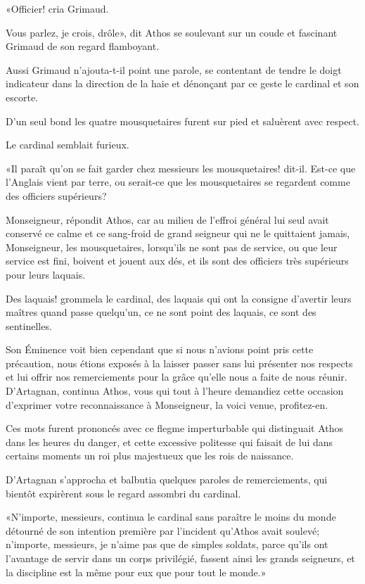 «Officier! cria Grimaud. 

\speak  Vous parlez, je crois, drôle», dit Athos se soulevant sur un coude et fascinant Grimaud de son regard flamboyant. 

Aussi Grimaud n'ajouta-t-il point une parole, se contentant de tendre le doigt indicateur dans la direction de la haie et dénonçant par ce geste le cardinal et son escorte. 

D'un seul bond les quatre mousquetaires furent sur pied et saluèrent avec respect. 

Le cardinal semblait furieux. 

«Il paraît qu'on se fait garder chez messieurs les mousquetaires! dit-il. Est-ce que l'Anglais vient par terre, ou serait-ce que les mousquetaires se regardent comme des officiers supérieurs? 

\speak  Monseigneur, répondit Athos, car au milieu de l'effroi général lui seul avait conservé ce calme et ce sang-froid de grand seigneur qui ne le quittaient jamais, Monseigneur, les mousquetaires, lorsqu'ils ne sont pas de service, ou que leur service est fini, boivent et jouent aux dés, et ils sont des officiers très supérieurs pour leurs laquais. 

\speak  Des laquais! grommela le cardinal, des laquais qui ont la consigne d'avertir leurs maîtres quand passe quelqu'un, ce ne sont point des laquais, ce sont des sentinelles. 

\speak  Son Éminence voit bien cependant que si nous n'avions point pris cette précaution, nous étions exposés à la laisser passer sans lui présenter nos respects et lui offrir nos remerciements pour la grâce qu'elle nous a faite de nous réunir. D'Artagnan, continua Athos, vous qui tout à l'heure demandiez cette occasion d'exprimer votre reconnaissance à Monseigneur, la voici venue, profitez-en. 

Ces mots furent prononcés avec ce flegme imperturbable qui distinguait Athos dans les heures du danger, et cette excessive politesse qui faisait de lui dans certains moments un roi plus majestueux que les rois de naissance. 

D'Artagnan s'approcha et balbutia quelques paroles de remerciements, qui bientôt expirèrent sous le regard assombri du cardinal. 

«N'importe, messieurs, continua le cardinal sans paraître le moins du monde détourné de son intention première par l'incident qu'Athos avait soulevé; n'importe, messieurs, je n'aime pas que de simples soldats, parce qu'ils ont l'avantage de servir dans un corps privilégié, fassent ainsi les grands seigneurs, et la discipline est la même pour eux que pour tout le monde.» 

